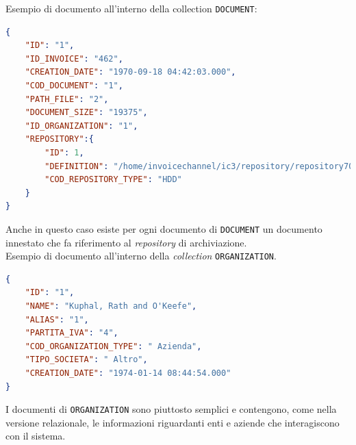 \noindent Esempio di documento all'interno della collection \texttt{DOCUMENT}:
\begin{lstlisting}[language=json,
        deletekeywords={IDENTITY,INT},
        morekeywords={clustered},    
        framesep=10pt,
        framextopmargin=10pt]
{
    "ID": "1",
    "ID_INVOICE": "462",
    "CREATION_DATE": "1970-09-18 04:42:03.000",
    "COD_DOCUMENT": "1",
    "PATH_FILE": "2",
    "DOCUMENT_SIZE": "19375",
    "ID_ORGANIZATION": "1",
    "REPOSITORY":{
        "ID": 1,
        "DEFINITION": "/home/invoicechannel/ic3/repository/repository70",
        "COD_REPOSITORY_TYPE": "HDD"
    }
}
\end{lstlisting}
\noindent Anche in questo caso esiste per ogni documento di \texttt{DOCUMENT} un documento innestato che fa riferimento al \textit{repository} di archiviazione.\\

\noindent Esempio di documento all'interno della \textit{collection} \texttt{ORGANIZATION}.
\begin{lstlisting}[language=json,
        deletekeywords={IDENTITY,INT},
        morekeywords={clustered},    
        framesep=10pt,
        framextopmargin=10pt]
{
    "ID": "1",
    "NAME": "Kuphal, Rath and O'Keefe",
    "ALIAS": "1",
    "PARTITA_IVA": "4",
    "COD_ORGANIZATION_TYPE": " Azienda",
    "TIPO_SOCIETA": " Altro",
    "CREATION_DATE": "1974-01-14 08:44:54.000"
}
\end{lstlisting}
\noindent I documenti di \texttt{ORGANIZATION} sono piuttosto semplici e contengono, come nella versione relazionale, le informazioni riguardanti enti e aziende che interagiscono con il sistema.\\